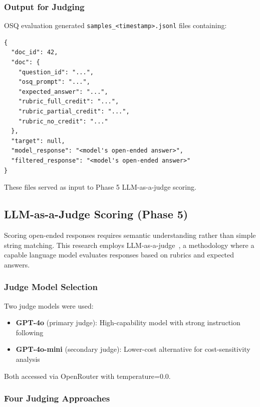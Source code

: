\subsubsection{Output for Judging}

OSQ evaluation generated \texttt{samples\_<timestamp>.jsonl} files containing:
\begin{verbatim}
{
  "doc_id": 42,
  "doc": {
    "question_id": "...",
    "osq_prompt": "...",
    "expected_answer": "...",
    "rubric_full_credit": "...",
    "rubric_partial_credit": "...",
    "rubric_no_credit": "..."
  },
  "target": null,
  "model_response": "<model's open-ended answer>",
  "filtered_response": "<model's open-ended answer>"
}
\end{verbatim}

These files served as input to Phase 5 LLM-as-a-judge scoring.





\subsection{LLM-as-a-Judge Scoring (Phase 5)}\label{sec:llm_judge}

Scoring open-ended responses requires semantic understanding rather than simple string matching. This research employs LLM-as-a-judge~\citep{zheng2023judging}, a methodology where a capable language model evaluates responses based on rubrics and expected answers.

\subsubsection{Judge Model Selection}

Two judge models were used:
\begin{itemize}
    \item \textbf{GPT-4o} (primary judge): High-capability model with strong instruction following
    \item \textbf{GPT-4o-mini} (secondary judge): Lower-cost alternative for cost-sensitivity analysis
\end{itemize}

Both accessed via OpenRouter with temperature=0.0.

\subsubsection{Four Judging Approaches}

